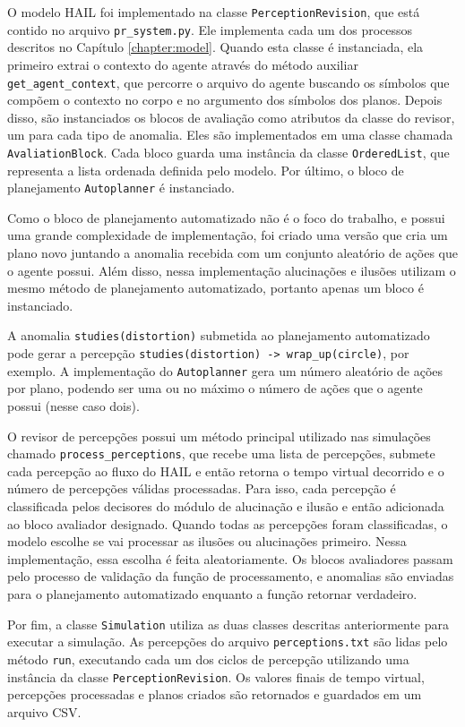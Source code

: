 O modelo HAIL foi implementado na classe \texttt{PerceptionRevision}, que está contido no arquivo \texttt{pr\_system.py}. Ele implementa cada um dos processos descritos no Capítulo \ref{chapter:model}. Quando esta classe é instanciada, ela primeiro extrai o contexto do agente através do método auxiliar \texttt{get\_agent\_context}, que percorre o arquivo do agente buscando os símbolos que compõem o contexto no corpo e no argumento dos símbolos dos planos. Depois disso, são instanciados os blocos de avaliação como atributos da classe do revisor, um para cada tipo de anomalia. Eles são implementados em uma classe chamada \texttt{AvaliationBlock}. Cada bloco guarda uma instância da classe \texttt{OrderedList}, que representa a lista ordenada definida pelo modelo. Por último, o bloco de planejamento \texttt{Autoplanner} é instanciado.

Como o bloco de planejamento automatizado não é o foco do trabalho, e possui uma grande complexidade de implementação, foi criado uma versão que cria um plano novo juntando a anomalia recebida com um conjunto aleatório de ações que o agente possui. Além disso, nessa implementação alucinações e ilusões utilizam o mesmo método de planejamento automatizado, portanto apenas um bloco é instanciado.

A anomalia \texttt{studies(distortion)} submetida ao planejamento automatizado pode gerar a percepção \texttt{studies(distortion) -> wrap\_up(circle)}, por exemplo. A implementação do \texttt{Autoplanner} gera um número aleatório de ações por plano, podendo ser uma ou no máximo o número de ações que o agente possui (nesse caso dois). 

O revisor de percepções possui um método principal utilizado nas simulações chamado \texttt{process\_perceptions}, que recebe uma lista de percepções, submete cada percepção ao fluxo do HAIL e então retorna o tempo virtual decorrido e o número de percepções válidas processadas. Para isso, cada percepção é classificada pelos decisores do módulo de alucinação e ilusão e então adicionada ao bloco avaliador designado. Quando todas as percepções foram classificadas, o modelo escolhe se vai processar as ilusões ou alucinações primeiro. Nessa implementação, essa escolha é feita aleatoriamente. Os blocos avaliadores passam pelo processo de validação da função de processamento, e anomalias são enviadas para o planejamento automatizado enquanto a função retornar verdadeiro.

Por fim, a classe \texttt{Simulation} utiliza as duas classes descritas anteriormente para executar a simulação. As percepções do arquivo \texttt{perceptions.txt} são lidas pelo método \texttt{run}, executando cada um dos ciclos de percepção utilizando uma instância da classe \texttt{PerceptionRevision}. Os valores finais de tempo virtual, percepções processadas e planos criados são retornados e guardados em um arquivo CSV.

